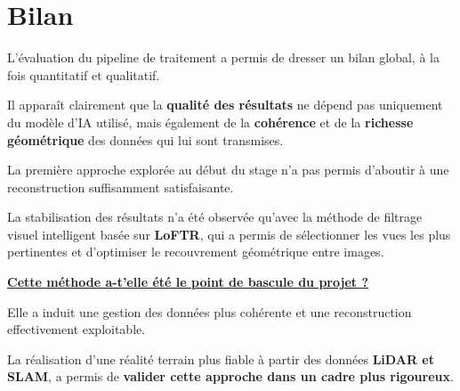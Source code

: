 \documentclass[12pt,a4paper,oneside]{report}
\begin{document}
\newpage

\section{Bilan}

\vspace{1.6cm}


\hspace*{1cm}L'évaluation du pipeline de traitement a permis de dresser un bilan global, à la fois quantitatif et qualitatif. \vspace{0.5cm}

\hspace*{0.5cm}Il apparaît clairement que la \textbf{qualité des résultats} ne dépend pas uniquement du modèle d'IA utilisé, mais également de la \textbf{cohérence} et de la \textbf{richesse géométrique} des données qui lui sont transmises.\vspace{0.1cm}

\hspace*{1cm}La première approche explorée au début du stage n'a pas permis d'aboutir à une reconstruction suffisamment satisfaisante.\vspace{0.03cm}

\hspace*{0.5cm} La stabilisation des résultats n'a été observée qu'avec la méthode de filtrage visuel intelligent basée sur \textbf{LoFTR}, qui a permis de sélectionner les vues les plus pertinentes et d'optimiser le recouvrement géométrique entre images. \vspace{0.5cm}

\vspace{1cm}

\noindent\textbf{\uline{\large Cette méthode a-t'elle été le point de bascule du projet ?}}\par
\medskip

\vspace{0.5cm}

\hspace*{1cm}Elle a induit une gestion des données plus cohérente et une reconstruction effectivement exploitable.\vspace{0.03cm}

\hspace*{0.5cm}La réalisation d'une réalité terrain plus fiable à partir des données \textbf{LiDAR et SLAM}, a permis de \textbf{valider cette approche dans un cadre plus rigoureux}.\vspace{0.6cm}
\end{document}
